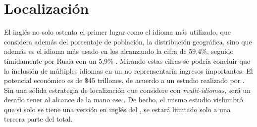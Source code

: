 




\section{Localización}

El inglés no solo ostenta el primer lugar como el idioma más utilizado, \rankingCPT que considera además del porcentaje de población, la distribución geográfica, sino que además es el idioma más usado en los \websitesINT alcanzando la cifra de 59,4\%, seguido tímidamente por Rusia con un 5,9\% \cite{online_world_wide_languages}. Mirando estas cifras se podría concluir que la inclusión de múltiples idiomas en un \siteINT \ecommerceCOM	no reprensentaría ingresos importantes.
El potencial económico \online es de \$45 trillones, de acuerdo a un estudio realizado por \commonSenseAdvisoryNAME \cite{online_world_global_oportunity_multi_languages}.  Sin una sólida estrategia de localización que considere \websitesINT \ecommerceCOM con \textit{multi-idiomas}, será  un desafío tener al alcance de la mano ese \revenueCOM. De hecho, el mismo estudio vislumbró que si solo se tiene una versión en inglés del \siteINT, se estará limitado solo a una tercera parte del total.


